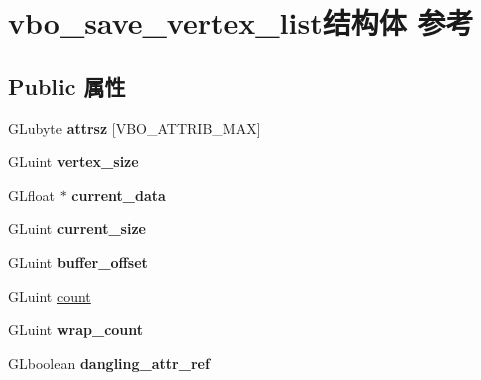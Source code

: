 \hypertarget{structvbo__save__vertex__list}{}\section{vbo\+\_\+save\+\_\+vertex\+\_\+list结构体 参考}
\label{structvbo__save__vertex__list}
\subsection*{Public 属性}
\begin{DoxyCompactItemize}
\item 
\mbox{\label{structvbo__save__vertex__list_a102a96aecf435c9ee6dbfb0f4d7b5300}} 
G\+Lubyte {\bfseries attrsz} \mbox{[}V\+B\+O\+\_\+\+A\+T\+T\+R\+I\+B\+\_\+\+M\+AX\mbox{]}
\item 
\mbox{\label{structvbo__save__vertex__list_aec3ff96a742aec09c2b63aa1bc8a3a67}} 
G\+Luint {\bfseries vertex\+\_\+size}
\item 
\mbox{\label{structvbo__save__vertex__list_a96506d15371eaf4889260f9db6907599}} 
G\+Lfloat $\ast$ {\bfseries current\+\_\+data}
\item 
\mbox{\label{structvbo__save__vertex__list_a29475c557d02f08456f65e52106615d3}} 
G\+Luint {\bfseries current\+\_\+size}
\item 
\mbox{\label{structvbo__save__vertex__list_a101e968d4cf45654a1a292368e168a77}} 
G\+Luint {\bfseries buffer\+\_\+offset}
\item 
G\+Luint \hyperlink{structvbo__save__vertex__list_a5c5b44780d0c33653c8c610fb26e108d}{count}
\item 
\mbox{\label{structvbo__save__vertex__list_a11c764773def8df4b7f78a2087cd9d4b}} 
G\+Luint {\bfseries wrap\+\_\+count}
\item 
\mbox{\label{structvbo__save__vertex__list_a5b029394d74512252f5f1f4ac8c376bc}} 
G\+Lboolean {\bfseries dangling\+\_\+attr\+\_\+ref}
\item 
\mbox{\label{structvbo__save__vertex__list_a9f36d98d1baed5cdb1c54c4e1339ce35}} 

\end{DoxyCompactItemize}
